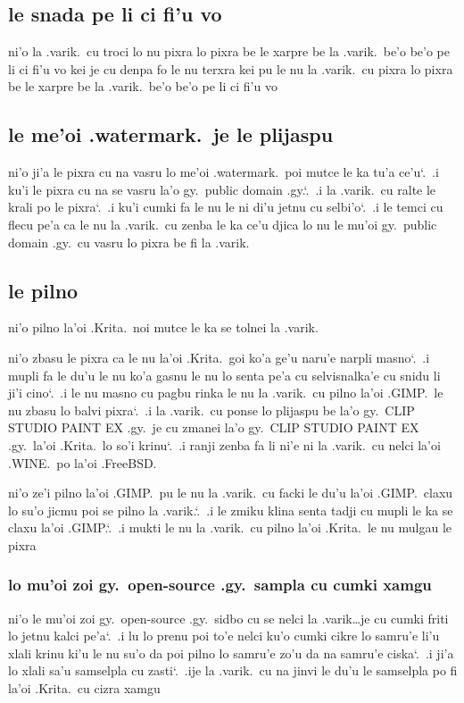\documentclass{report}
\newcommand\sds{\spacefactor\sfcode`.\ \space}
\begin{document}
\subsection{le snada pe li ci fi'u vo}
ni'o la .varik.\ cu troci lo nu pixra lo pixra be le xarpre be la .varik.\ be'o be'o pe li ci fi'u vo kei je cu denpa fo le nu terxra kei pu le nu la .varik.\ cu pixra lo pixra be le xarpre be la .varik.\ be'o be'o pe li ci fi'u vo
\subsection{le me'oi .watermark.\ je le plijaspu}
ni'o ji'a le pixra cu na vasru lo me'oi .watermark.\ poi mutce le ka tu'a ce'u\sds  .i ku'i le pixra cu na se vasru la'o gy.\ public domain .gy.\sds  .i la .varik.\ cu ralte le krali po le pixra\sds  .i ku'i cumki fa le nu le ni di'u jetnu cu selbi'o\sds  .i le temci cu flecu pe'a ca le nu la .varik.\ cu zenba le ka ce'u djica lo nu le mu'oi gy.\ public domain .gy.\ cu vasru lo pixra be fi la .varik.

\subsection{le pilno}
ni'o pilno la'oi .Krita.\ noi mutce le ka se tolnei la .varik.

ni'o zbasu le pixra ca le nu la'oi .Krita.\ goi ko'a ge'u naru'e narpli masno\sds  .i mupli fa le du'u le nu ko'a gasnu le nu lo senta pe'a cu selvisnalka'e cu snidu li ji'i cino\sds  .i le nu masno cu pagbu rinka le nu la .varik.\ cu pilno la'oi .GIMP.\ le nu zbasu lo balvi pixra\sds  .i la .varik.\ cu ponse lo plijaspu be la'o gy.\ CLIP STUDIO PAINT EX .gy.\ je cu zmanei la'o gy.\ CLIP STUDIO PAINT EX .gy.\ la'oi .Krita.\ lo so'i krinu\sds  .i ranji zenba fa li ni'e ni la .varik.\ cu nelci la'oi .WINE.\ po la'oi .FreeBSD.

ni'o ze'i pilno la'oi .GIMP.\ pu le nu la .varik.\ cu facki le du'u la'oi .GIMP.\ claxu lo su'o jicmu poi se pilno la .varik.\sds  .i le zmiku klina senta tadji cu mupli le ka se claxu la'oi .GIMP.\sds  .i mukti le nu la .varik.\ cu pilno la'oi .Krita.\ le nu mulgau le pixra

\subsubsection{lo mu'oi zoi gy.\ open-source .gy.\ sampla cu cumki xamgu}
ni'o le mu'oi zoi gy.\ open-source .gy.\ sidbo cu se nelci la .varik\ldots je cu cumki friti lo jetnu kalci pe'a\sds  .i lu lo prenu poi to'e nelci ku'o cumki cikre lo samru'e li'u xlali krinu ki'u le nu su'o da poi pilno lo samru'e zo'u da na samru'e ciska\sds  .i ji'a lo xlali sa'u samselpla cu zasti\sds  .ije la .varik.\ cu na jinvi le du'u le samselpla po fi la'oi .Krita.\ cu cizra xamgu
\end{document}
